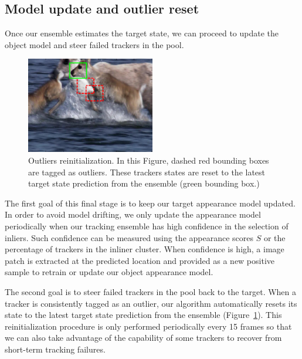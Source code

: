 \subsection{Model update and outlier reset}
Once our ensemble estimates the target state, we can proceed to update the
object model and steer failed trackers in the pool.

\begin{figure}[b!]
\centering
\includegraphics[width=0.5\textwidth]{Figures/clustering/deer_outliers.png}
\caption[Outliers reinitialization]{Outliers reinitialization. In this Figure,
dashed red bounding boxes are tagged as outliers. These trackers states are
reset to the latest target state prediction from the ensemble (green bounding
box.)}
\label{fig::outliers}
\end{figure}

The first goal of this final stage is to keep our target appearance model
updated. In order to avoid model drifting, we only update the appearance
model periodically when our tracking ensemble has high confidence in the
selection of inliers. Such confidence can be measured using the appearance
scores $S$ or the percentage of trackers in the inliner cluster.
When confidence is high, a image patch is extracted at the predicted
location and provided as a new positive sample to retrain or update
our object appearance model.

The second goal is to steer failed trackers in the pool back to the target.
When a tracker is consistently tagged as an outlier, our algorithm automatically
resets its state to the latest target state prediction from the ensemble
(Figure~\ref{fig::outliers}).
This reinitialization procedure is only performed periodically every 15 frames
so that we can also take advantage of the capability of some trackers
to recover from short-term tracking failures.


